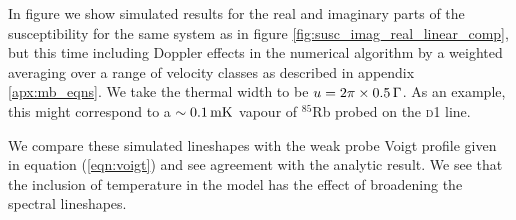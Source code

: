    In figure \label{fig:linear_scan_dopp} we show simulated results for the
    real and imaginary parts of the susceptibility for the same system as in
    figure  \ref{fig:susc_imag_real_linear_comp}, but this time including
    Doppler effects in the numerical algorithm by a weighted averaging over a
    range of velocity classes as described in appendix \ref{apx:mb_eqns}. We
    take the thermal width to be $u = \unit[2\pi\times0.5]{\Gamma}$. As an
    example, this might correspond to a $\unit[\sim0.1]{mK}$ vapour of
    ${^{85}}$Rb probed on the \textsc{d1} line.

    We compare these simulated lineshapes with the weak probe Voigt profile
    given in equation (\ref{eqn:voigt}) and see agreement with the analytic
    result. We see that the inclusion of temperature in the model has the effect
    of broadening the spectral lineshapes.

